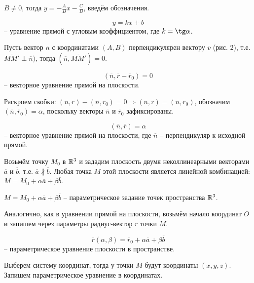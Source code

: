 	$B \neq 0$, тогда $y = -\frac{A}{B}x - \frac{C}{B}$, введём обозначения.
	\begin{Def}
		$$y = kx + b$$ -- уравнение прямой с угловым коэффициентом, где $k = \tg \alpha$.
	\end{Def}

	Пусть вектор $\overline{n}$ с координатами $(A,B)$ перпендикулярен вектору  $\overline{v}$ (рис. 2), т.е. $\overline{MM'} \perp \overline{n})$, тогда $(\overline{n}, \overline{MM'}) = 0$.

	\begin{Def}
		$$(\overline{n}, \overline{r} - \overline{r}_0) = 0$$ -- векторное уравнение прямой на плоскости.
	\end{Def}

	Раскроем скобки: $(\overline{n}, \overline{r}) - (\overline{n}, \overline{r}_0) = 0 \Rightarrow (\overline{n}, \overline{r}) = (\overline{n}, \overline{r}_0)$, обозначим $(\overline{n}, \overline{r}_0) = \alpha$, поскольку векторы $\overline{n}$ и $\overline{r}_0$ зафиксированы.

	\begin{Def}
		$$(\overline{n}, \overline{r}) = \alpha$$ -- векторное уравнение прямой на плоскости, где $\overline{n}$ -- перпендикуляр к исходной прямой.
	\end{Def}

	
	Возьмём точку $M_0$ в $\mathbb{R}^3$ и зададим плоскость двумя неколлинеарными векторами $\overline{a}$ и $\overline{b}$, т.е. $\overline{a} \nparallel \overline{b}$. Любая точка $M$ этой плоскости является линейной комбинацией: $M = M_0 + \alpha \overline{a} + \beta \overline{b}$.
	
	\begin{Def}
		$M = M_0 + \alpha \overline{a}  + \beta \overline{b}$ -- параметрическое задание точек пространства $\mathbb{R}^3$.
	\end{Def}
	
	Аналогично, как в уравнении прямой на плоскости, возьмём начало координат $O$ и запишем через параметры радиус-вектор $\overline{r}$ точки $M$.

	\begin{Def}
		$$\overline{r} (\alpha, \beta) = \overline{r}_0 + \alpha \overline{a} + \beta \overline{b}$$ -- параметрическое уравнение плоскости в пространстве.
	\end{Def}

	Выберем систему координат, тогда у точки $M$ будут координаты $(x, y, z)$. Запишем параметрическое уравнение в координатах.

